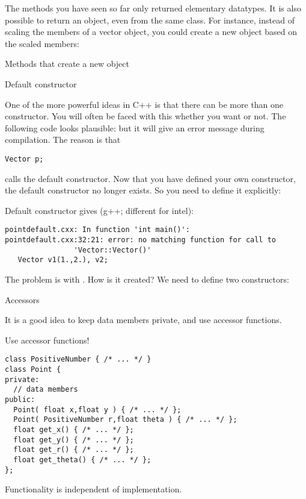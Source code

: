 The methods you have seen so far only returned elementary
datatypes. It is also possible to return an object, even from the same
class. For instance, instead of scaling the members of a vector object, you
could create a new object based on the scaled members:
%

\begin{slide}{Methods that create a new object}
  \label{sl:obj-return}
\end{slide}

 {Default constructor}

One of the more powerful ideas in C++ is that there can be more than
one constructor. You will often be faced with this whether you want or
not. The following code looks plausible:
%
%
but it will give an error message during compilation. The reason is
that 
\begin{lstlisting}
Vector p;
\end{lstlisting}
calls the default constructor. Now that you have defined your own
constructor, the default constructor no longer exists. So you need to
define it explicitly:
%

\begin{slide}{Default constructor}
  \label{sl:obj-def-construct}
\small
  gives (g++; different for intel):
\begin{lstlisting}
pointdefault.cxx: In function 'int main()':
pointdefault.cxx:32:21: error: no matching function for call to
                'Vector::Vector()'
   Vector v1(1.,2.), v2;
\end{lstlisting}
The problem is with . How is it created? We need to define two constructors:
\end{slide}

 {Accessors}

It is a good idea to keep data members private, and use accessor
functions.

\begin{block}{Use accessor functions!}
  \label{sl:repr-independent}
\begin{lstlisting}
class PositiveNumber { /* ... */ }
class Point {
private:
  // data members
public:
  Point( float x,float y ) { /* ... */ };
  Point( PositiveNumber r,float theta ) { /* ... */ };
  float get_x() { /* ... */ };
  float get_y() { /* ... */ };
  float get_r() { /* ... */ };
  float get_theta() { /* ... */ };
};
\end{lstlisting}
  Functionality is independent of implementation.
\end{block}


